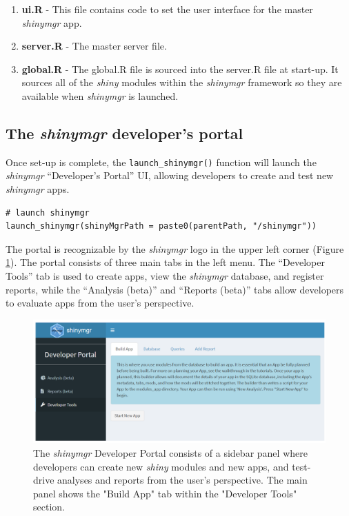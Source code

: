 \begin{itemize}
  \begin{enumerate}
  \def\labelenumi{\arabic{enumi}.}
  \tightlist
  \item
    \textbf{ui.R} - This file contains code to set the user interface for the master \emph{shinymgr} app.\\
  \item
    \textbf{server.R} - The master server file.\\
  \item
    \textbf{global.R} - The global.R file is sourced into the server.R file at start-up. It sources all of the \emph{shiny} modules within the \emph{shinymgr} framework so they are available when \emph{shinymgr} is launched.
  \end{enumerate}
\end{itemize}

\subsection{\texorpdfstring{The \emph{shinymgr} developer's portal}{The shinymgr developer's portal}}\label{the-shinymgr-developers-portal}

Once set-up is complete, the \texttt{launch\_shinymgr()} function will launch the \emph{shinymgr} ``Developer's Portal'' UI, allowing developers to create and test new \emph{shinymgr} apps.

\begin{verbatim}
# launch shinymgr
launch_shinymgr(shinyMgrPath = paste0(parentPath, "/shinymgr"))
\end{verbatim}

The portal is recognizable by the \emph{shinymgr} logo in the upper left corner (Figure \ref{fig:fig3}). The portal consists of three main tabs in the left menu. The ``Developer Tools'' tab is used to create apps, view the \emph{shinymgr} database, and register reports, while the ``Analysis (beta)'' and ``Reports (beta)'' tabs allow developers to evaluate apps from the user's perspective.

\begin{figure}
\includegraphics[width=1\linewidth]{images/figure3} \caption{The \textit{shinymgr} Developer Portal consists of a sidebar panel where developers can create new \textit{shiny} modules and new apps, and test-drive analyses and reports from the user's perspective. The main panel shows the "Build App" tab within the "Developer Tools" section.}\label{fig:fig3}
\end{figure}

